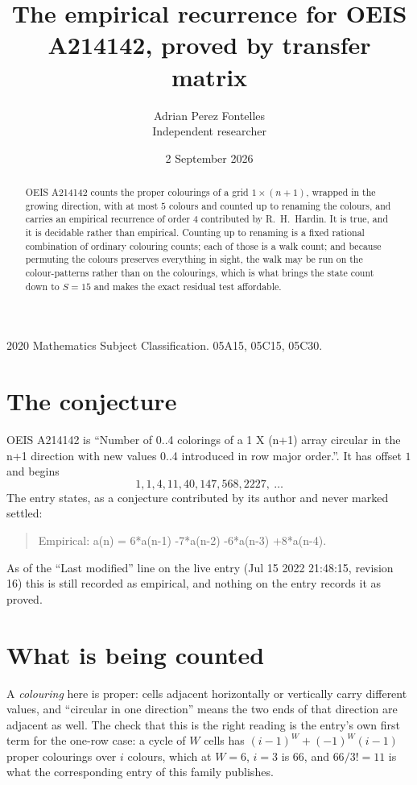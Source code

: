 \documentclass[11pt,a4paper]{article}
\title{The empirical recurrence for OEIS A214142, proved by transfer matrix}
\author{Adrian Perez Fontelles\\ \small Independent researcher}
\date{2 September 2026}
\theoremstyle{plain}
\theoremstyle{definition}
\begin{document}
\maketitle

\begin{abstract}
OEIS A214142 counts the proper colourings of a grid $1\times(n+1)$, wrapped in the growing direction, with at most $5$ colours and
counted up to renaming the colours, and carries an empirical recurrence of order $4$
contributed by R.~H.~Hardin. It is true, and it is decidable rather than empirical. Counting
up to renaming is a fixed rational combination of ordinary colouring counts; each of those is
a walk count; and because permuting the colours preserves everything in sight, the walk may be
run on the colour-patterns rather than on the colourings, which is what brings the state count
down to $S=15$ and makes the exact residual test affordable.
\end{abstract}

\noindent\small 2020 Mathematics Subject Classification. 05A15, 05C15, 05C30.\normalsize

\section{The conjecture}

OEIS A214142 is ``Number of 0..4 colorings of a 1 X (n+1) array circular in the n+1 direction with new values 0..4 introduced in row major order.''. It has offset $1$ and begins
\[
1, 1, 4, 11, 40, 147, 568, 2227,\ \dots
\]
The entry states, as a conjecture contributed by its author and never marked settled:
\begin{quote}
Empirical: a(n) = 6*a(n-1) -7*a(n-2) -6*a(n-3) +8*a(n-4).
\end{quote}
As of the ``Last modified'' line on the live entry (Jul 15 2022 21:48:15, revision 16) this is still
recorded as empirical, and nothing on the entry records it as proved.

\section{What is being counted}

A \emph{colouring} here is proper: cells adjacent horizontally or vertically carry different
values, and ``circular in one direction'' means the two ends of that direction are adjacent as
well. The check that this is the right reading is the entry's own first term for the
one-row case: a cycle of $W$ cells has $(i-1)^W+(-1)^W(i-1)$ proper colourings over $i$
colours, which at $W=6$, $i=3$ is $66$, and $66/3!=11$ is what the corresponding entry of this
family publishes.
\end{document}
